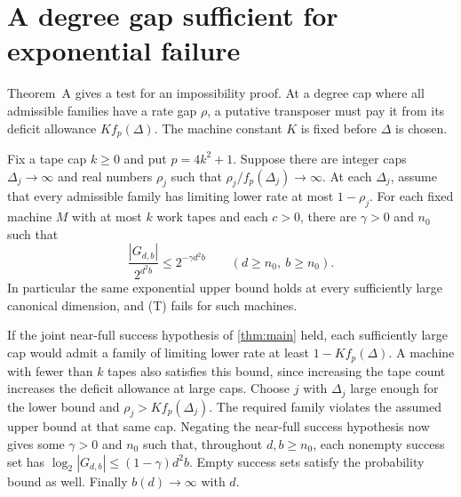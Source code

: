 \section{A degree gap sufficient for exponential failure}\label{sec:consequences}

Theorem~A gives a test for an impossibility proof. At a degree cap where
all admissible families have a rate gap $\rho$, a putative transposer
must pay it from its deficit allowance $K f_p(\Delta)$. The machine
constant $K$ is fixed before $\Delta$ is chosen.

\begin{corollary}\label{cor:gap}
Fix a tape cap $k\ge0$ and put $p=4k^2+1$. Suppose there are integer
caps $\Delta_j\to\infty$ and real numbers $\rho_j$ such that
$\rho_j/f_p(\Delta_j)\to\infty$. At each $\Delta_j$, assume that
every admissible family has limiting lower rate at most $1-\rho_j$.
For each fixed machine $M$ with at most $k$ work tapes and each $c>0$,
there are $\gamma>0$ and $n_0$ such that
\[
   \frac{|G_{d,b}|}{2^{d^2b}}
      \le 2^{-\gamma d^2b}
      \qquad(d\ge n_0,\ b\ge n_0).
\]
In particular the same exponential upper bound holds at every
sufficiently large canonical dimension, and (T) fails for such machines.
\end{corollary}

\begin{outline}
If the joint near-full success hypothesis of \cref{thm:main} held,
each sufficiently large cap would admit a family of limiting lower rate
at least $1-K f_p(\Delta)$. A machine with fewer than $k$ tapes also
satisfies this bound, since increasing the tape count increases the
deficit allowance at large caps. Choose $j$ with $\Delta_j$ large
enough for the lower bound and $\rho_j>K f_p(\Delta_j)$. The required
family violates the assumed upper bound at that same cap.
Negating the near-full success hypothesis now gives some $\gamma>0$ and
$n_0$ such that, throughout $d,b\ge n_0$, each nonempty success set has
$\log_2|G_{d,b}|\le(1-\gamma)d^2b$. Empty success sets satisfy the
probability bound as well. Finally $b(d)\to\infty$ with $d$.
\end{outline}

